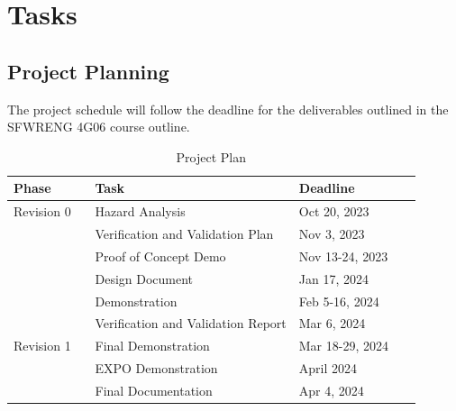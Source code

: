 \documentclass[12pt]{article}
\begin{document}
\section{Tasks}
\subsection{Project Planning}

The project schedule will follow the deadline for the deliverables outlined in the SFWRENG
4G06 course outline.

\begin{table}[H]
    \centering
    \begin{tabular}{|p{0.2\linewidth} | p{0.5\linewidth}| p{0.3\linewidth} |}
    \hline
    \textbf{Phase} & \textbf{Task} & \textbf{Deadline}\\
    \hline
    Revision 0 & Hazard Analysis & Oct 20, 2023 \\
     \cline{2-3} & Verification and Validation Plan & Nov 3, 2023 \\
     \cline{2-3} & Proof of Concept Demo & Nov 13-24, 2023\\
     \cline{2-3} & Design Document & Jan 17, 2024\\
     \cline{2-3} & Demonstration & Feb 5-16, 2024\\
     \cline{2-3} & Verification and Validation Report & Mar 6, 2024\\
     \hline
     Revision 1 & Final Demonstration & Mar 18-29, 2024\\
     \cline{2-3} & EXPO Demonstration & April 2024\\
     \cline{2-3} & Final Documentation & Apr 4, 2024\\
    \hline
    \end{tabular}
    \caption{Project Plan}
    \label{TblProjectTasks}
\end{table}
\end{document}

